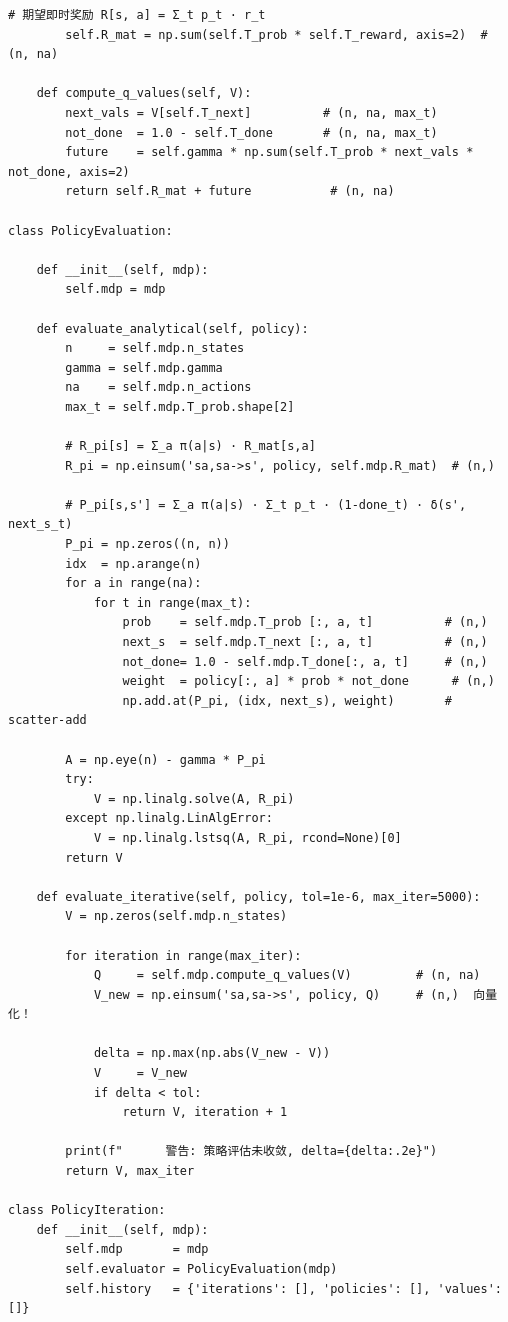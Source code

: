 \documentclass[12pt,a4paper]{article}
\begin{document}
\begin{lstlisting}[caption={策略迭代与值迭代算法完整实现（3.py）}]
        # 期望即时奖励 R[s, a] = Σ_t p_t · r_t
        self.R_mat = np.sum(self.T_prob * self.T_reward, axis=2)  # (n, na)

    def compute_q_values(self, V):
        next_vals = V[self.T_next]          # (n, na, max_t)
        not_done  = 1.0 - self.T_done       # (n, na, max_t)
        future    = self.gamma * np.sum(self.T_prob * next_vals * not_done, axis=2)
        return self.R_mat + future           # (n, na)

class PolicyEvaluation:

    def __init__(self, mdp):
        self.mdp = mdp

    def evaluate_analytical(self, policy):
        n     = self.mdp.n_states
        gamma = self.mdp.gamma
        na    = self.mdp.n_actions
        max_t = self.mdp.T_prob.shape[2]

        # R_pi[s] = Σ_a π(a|s) · R_mat[s,a]
        R_pi = np.einsum('sa,sa->s', policy, self.mdp.R_mat)  # (n,)

        # P_pi[s,s'] = Σ_a π(a|s) · Σ_t p_t · (1-done_t) · δ(s', next_s_t)
        P_pi = np.zeros((n, n))
        idx  = np.arange(n)
        for a in range(na):
            for t in range(max_t):
                prob    = self.mdp.T_prob [:, a, t]          # (n,)
                next_s  = self.mdp.T_next [:, a, t]          # (n,)
                not_done= 1.0 - self.mdp.T_done[:, a, t]     # (n,)
                weight  = policy[:, a] * prob * not_done      # (n,)
                np.add.at(P_pi, (idx, next_s), weight)       # scatter-add

        A = np.eye(n) - gamma * P_pi
        try:
            V = np.linalg.solve(A, R_pi)
        except np.linalg.LinAlgError:
            V = np.linalg.lstsq(A, R_pi, rcond=None)[0]
        return V

    def evaluate_iterative(self, policy, tol=1e-6, max_iter=5000):
        V = np.zeros(self.mdp.n_states)

        for iteration in range(max_iter):
            Q     = self.mdp.compute_q_values(V)         # (n, na)
            V_new = np.einsum('sa,sa->s', policy, Q)     # (n,)  向量化！

            delta = np.max(np.abs(V_new - V))
            V     = V_new
            if delta < tol:
                return V, iteration + 1

        print(f"      警告: 策略评估未收敛, delta={delta:.2e}")
        return V, max_iter

class PolicyIteration:
    def __init__(self, mdp):
        self.mdp       = mdp
        self.evaluator = PolicyEvaluation(mdp)
        self.history   = {'iterations': [], 'policies': [], 'values': []}


\end{lstlisting}
\end{document}
